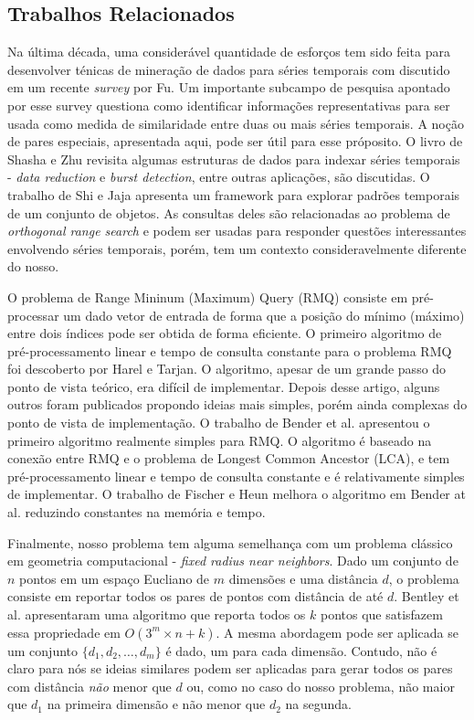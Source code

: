 \documentclass[12pt]{article}
\begin{document}
\subsection{Trabalhos Relacionados}
Na última década, uma considerável quantidade de esforços tem sido
feita para desenvolver ténicas de mineração de dados para séries
temporais com discutido em um recente \textit{survey} por Fu\cite{lala}.
Um importante subcampo de pesquisa apontado por esse survey questiona
como identificar informações representativas para ser usada como medida
de similaridade entre duas ou mais séries temporais. A noção de pares
especiais, apresentada aqui, pode ser útil para esse próposito. O livro
de Shasha e Zhu \cite{lala} revisita algumas estruturas de dados para indexar
séries temporais - \textit{data reduction} e \textit{burst detection}, entre outras
aplicações, são discutidas. O trabalho de Shi e Jaja\cite{lala} apresenta um framework
para explorar padrões temporais de um conjunto de objetos. As consultas deles são relacionadas
ao problema de \textit{orthogonal range search} e podem ser usadas para responder questões
interessantes envolvendo séries temporais, porém, tem um contexto consideravelmente diferente
do nosso.
        
O problema de Range Mininum (Maximum) Query (RMQ) consiste em pré-processar um dado
vetor de entrada de forma que a posição do mínimo (máximo) entre dois índices pode
ser obtida de forma eficiente. O primeiro algoritmo de pré-processamento linear e tempo
de consulta constante para o problema RMQ foi descoberto por Harel e Tarjan\cite{lala}. 
O algoritmo, apesar de um grande passo do ponto de vista teórico, era difícil de implementar.
Depois desse artigo, alguns outros foram publicados propondo ideias mais simples, porém ainda
complexas do ponto de vista de implementação. O trabalho de Bender et al. \cite{lala} apresentou
o primeiro algoritmo realmente simples para RMQ. O algoritmo é baseado na conexão entre RMQ e
o problema de  Longest Common Ancestor (LCA), e tem pré-processamento linear e tempo de consulta
constante e é relativamente simples de implementar. O trabalho de Fischer e Heun\cite{} melhora
o algoritmo em Bender at al. reduzindo constantes na memória e tempo.

Finalmente, nosso problema tem alguma semelhança com um problema clássico em geometria computacional -
\textit{fixed radius near neighbors}. Dado um conjunto de $n$ pontos em um espaço Eucliano de $m$ dimensões
e uma distância $d$, o problema consiste em reportar todos os pares de pontos com distância de até $d$.
Bentley et al.\cite{lala} apresentaram uma algoritmo que reporta todos os $k$ pontos que satisfazem
essa propriedade em $O(3^m\times n + k)$. A mesma abordagem pode ser aplicada se um conjunto $\{d_1, d_2, \ldots, d_m\}$ é dado, um para cada dimensão. Contudo, não é claro para nós se ideias similares podem ser aplicadas
para gerar todos os pares com distância \textit{não} menor que $d$ ou, como no caso do nosso problema, não 
maior que $d_1$ na primeira dimensão e não menor que $d_2$ na segunda.
\end{document}
